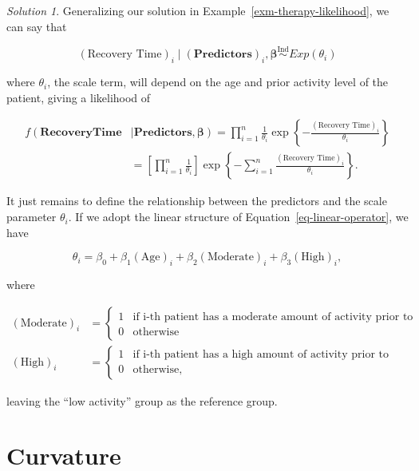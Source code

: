 \documentclass[
  letterpaper,
  DIV=11,
  numbers=noendperiod]{scrreprt}
\theoremstyle{definition}
\theoremstyle{definition}
\theoremstyle{plain}
\theoremstyle{remark}
\newtheorem*{solution}{Solution}
\begin{document}
\begin{solution}

Generalizing our solution in Example~\ref{exm-therapy-likelihood}, we
can say that

\[(\text{Recovery Time})_i \mid (\mathbf{Predictors})_i, \boldsymbol{\beta} \stackrel{\text{Ind}}{\sim}Exp\left(\theta_i\right)\]

where \(\theta_i\), the scale term, will depend on the age and prior
activity level of the patient, giving a likelihood of

\[
\begin{aligned}
f\left(\mathbf{Recovery Time} \right. &\mid \left. \mathbf{Predictors}, \boldsymbol{\beta}\right) 
    = \prod_{i=1}^{n} \frac{1}{\theta_i} \exp\left\{- \frac{(\text{Recovery Time})_i}{\theta_i}\right\} \\
    &= \left[\prod_{i=1}^{n} \frac{1}{\theta_i}\right] \exp\left\{-\sum_{i=1}^{n} \frac{(\text{Recovery Time})_i}{\theta_i}\right\}.
\end{aligned}
\]

It just remains to define the relationship between the predictors and
the scale parameter \(\theta_i\). If we adopt the linear structure of
Equation~\ref{eq-linear-operator}, we have

\[\theta_i = \beta_0 + \beta_1 (\text{Age})_i + \beta_2 (\text{Moderate})_i + \beta_3 (\text{High})_i,\]

where

\[
\begin{aligned}
  (\text{Moderate})_i 
    &= \begin{cases} 1 & \text{if i-th patient has a moderate amount of activity prior to surgery} \\ 0 & \text{otherwise} \end{cases} \\
  (\text{High})_i
    &= \begin{cases} 1 & \text{if i-th patient has a high amount of activity prior to surgery} \\ 0 & \text{otherwise}, \end{cases}
\end{aligned}
\]

leaving the ``low activity'' group as the reference group.

\end{solution}

\hypertarget{curvature}{%
\section{Curvature}\label{curvature}}
\end{document}

